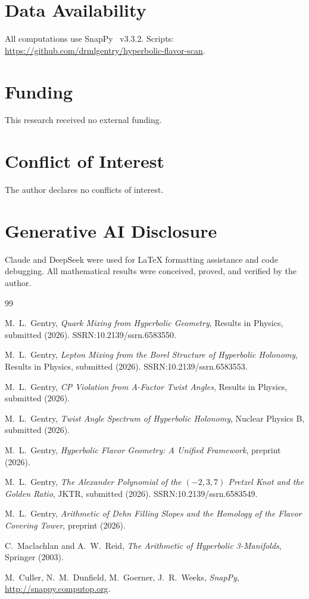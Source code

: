 \documentclass[12pt]{article}
\theoremstyle{definition}
\begin{document}
\section*{Data Availability}
All computations use SnapPy~\cite{snappy} v3.3.2.
Scripts: \url{https://github.com/drmlgentry/hyperbolic-flavor-scan}.

\section*{Funding}
This research received no external funding.

\section*{Conflict of Interest}
The author declares no conflicts of interest.

\section*{Generative AI Disclosure}
Claude and DeepSeek were used for \LaTeX{} formatting assistance
and code debugging. All mathematical results were conceived, proved,
and verified by the author.

\begin{thebibliography}{99}

M.~L.~Gentry,
\textit{Quark Mixing from Hyperbolic Geometry},
Results in Physics, submitted (2026). SSRN:10.2139/ssrn.6583550.

M.~L.~Gentry,
\textit{Lepton Mixing from the Borel Structure of Hyperbolic Holonomy},
Results in Physics, submitted (2026). SSRN:10.2139/ssrn.6583553.

M.~L.~Gentry,
\textit{CP Violation from A-Factor Twist Angles},
Results in Physics, submitted (2026).

M.~L.~Gentry,
\textit{Twist Angle Spectrum of Hyperbolic Holonomy},
Nuclear Physics B, submitted (2026).

M.~L.~Gentry,
\textit{Hyperbolic Flavor Geometry: A Unified Framework},
preprint (2026).

M.~L.~Gentry,
\textit{The Alexander Polynomial of the $(-2,3,7)$ Pretzel Knot
and the Golden Ratio}, JKTR, submitted (2026).
SSRN:10.2139/ssrn.6583549.

M.~L.~Gentry,
\textit{Arithmetic of Dehn Filling Slopes and the Homology of
the Flavor Covering Tower}, preprint (2026).

C.~Maclachlan and A.~W.~Reid,
\textit{The Arithmetic of Hyperbolic 3-Manifolds},
Springer (2003).

M.~Culler, N.~M.~Dunfield, M.~Goerner, J.~R.~Weeks,
\textit{SnapPy}, \url{http://snappy.computop.org}.

\end{thebibliography}
\end{document}

